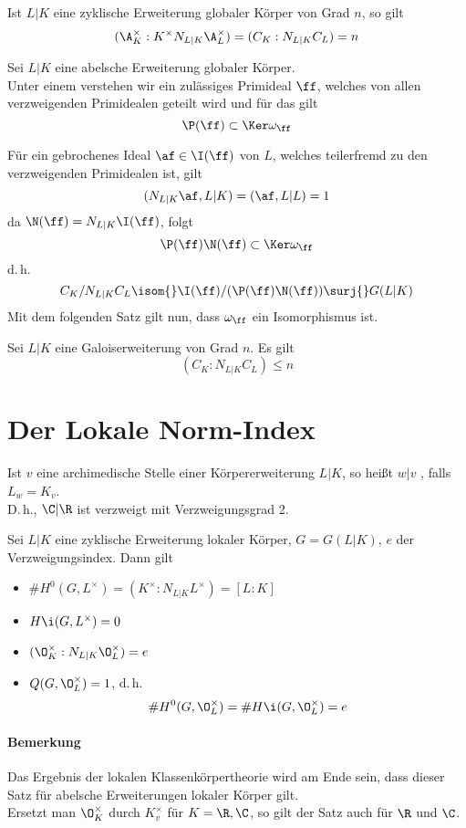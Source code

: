 \Satz{}
Ist $L|K$ eine zyklische Erweiterung globaler Körper von Grad $n$, so gilt
\[ (\A_K^\times : K^\times N_{L|K} \A_L^\times ) = (C_K : N_{L|K}C_L) = n \]

Sei $L|K$ eine abelsche Erweiterung globaler Körper.\\
Unter einem  verstehen wir ein zulässiges Primideal $\ff$, welches von allen verzweigenden Primidealen geteilt wird und für das gilt
\[ \P(\ff) \subset \Ker \omega_\ff \]

\Bem{}
Für ein gebrochenes Ideal $\af \in \I(\ff)$ von $L$, welches teilerfremd zu den verzweigenden Primidealen ist, gilt
\[ (N_{L|K}\af, L|K) = (\af, L|L) = 1 \]
da $\N(\ff) = N_{L|K} \I(\ff)$, folgt
\[ \P(\ff) \N(\ff) \subset \Ker \omega_\ff  \]
d.\,h.
\[ C_K/N_{L|K}C_L \isom{} \I(\ff) / (\P(\ff) \N(\ff)) \surj{} G(L|K) \]
Mit dem folgenden Satz gilt nun, dass $\omega_\ff$ ein Isomorphismus ist.

Sei $L|K$ eine Galoiserweiterung von Grad $n$. Es gilt
\[ (C_K : N_{L|K}C_L ) \leq n \]

\section{Der Lokale Norm-Index}

Ist $v$ eine archimedische Stelle einer Körpererweiterung $L|K$, so heißt $w|v$ , falls $L_w = K_v$.\\
D.\,h., $\C|\R$ ist verzweigt mit Verzweigungsgrad 2.

\Satz{}
Sei $L|K$ eine zyklische Erweiterung lokaler Körper, $G = G(L|K)$, $e$ der Verzweigungsindex. Dann gilt
\begin{itemize}
\item $\# H^0(G,L^\times) = (K^\times : N_{L|K}L^\times) = [L:K]$
\item $H\i(G,L^\times) = 0$
\item $(\O_K^\times : N_{L|K}\O_L^\times) = e$
\item $Q(G, \O_L^\times) = 1$, d.\,h. 
\[ \#H^0(G, \O_L^\times) = \#H\i(G, \O_L^\times) = e \]
\end{itemize}
\paragraph{Bemerkung}
Das Ergebnis der lokalen Klassenkörpertheorie wird am Ende sein, dass dieser Satz für abelsche Erweiterungen lokaler Körper gilt.\\
Ersetzt man $\O_K^\times$ durch $K_v^\times$ für $K = \R,\C$, so gilt der Satz auch für $\R$ und $\C$.

